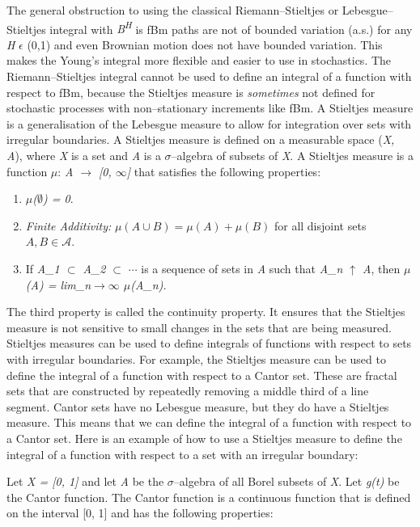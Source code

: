 \documentclass[12pt,a4paper]{report}
\numberwithin{equation}{section}
\begin{document}
The general obstruction to using the classical
Riemann--Stieltjes or Lebesgue--Stieltjes integral with
\emph{B\textsuperscript{H}} is fBm paths are not of bounded variation
(a.s.) for any \emph{H} \(\epsilon\) (0,1) and even Brownian motion does
not have bounded variation. This makes the Young's integral more
flexible and easier to use in stochastics. The Riemann--Stieltjes
integral cannot be used to define an integral of a function with respect
to fBm, because the Stieltjes measure is \emph{sometimes} not defined
for stochastic processes with non--stationary increments like fBm. A
Stieltjes measure is a generalisation of the Lebesgue measure to allow
for integration over sets with irregular boundaries. A Stieltjes measure
is defined on a measurable space (\emph{X, A}), where \emph{X} is a set
and \emph{A} is a $\sigma$--algebra of subsets of \emph{X}. A Stieltjes measure
is a function \emph{$\mu$}: \emph{A $\rightarrow$ {[}0, $\infty${]}} that satisfies the
following properties:

\begin{enumerate}
\def\labelenumi{\roman{enumi}.}
\item
  \emph{$\mu$($\emptyset$) = 0}.
\item \emph{Finite Additivity:} $\mu(A \cup B) = \mu(A) + \mu(B)$ for all disjoint sets $A, B \in \mathcal{A}$.
\item
  If \emph{A\_1 $\subset$ A\_2 $\subset$} $\cdots$ is a sequence of sets in \emph{A} such that
  \emph{A\_n $\uparrow$ A}, then \emph{$\mu$(A) = lim\_n$\rightarrow$$\infty$ $\mu$(A\_n).}
\end{enumerate}

The third property is called the continuity property. It ensures that
the Stieltjes measure is not sensitive to small changes in the sets that
are being measured. Stieltjes measures can be used to define integrals
of functions with respect to sets with irregular boundaries. For
example, the Stieltjes measure can be used to define the integral of a
function with respect to a Cantor set. These are fractal sets that are
constructed by repeatedly removing a middle third of a line segment.
Cantor sets have no Lebesgue measure, but they do have a Stieltjes
measure. This means that we can define the integral of a function with
respect to a Cantor set. Here is an example of how to use a Stieltjes
measure to define the integral of a function with respect to a set with
an irregular boundary:

Let \emph{X = {[}0, 1{]}} and let \emph{A} be the $\sigma$--algebra of all Borel
subsets of \emph{X}. Let \emph{g(t)} be the Cantor function. The Cantor
function is a continuous function that is defined on the interval {[}0,
1{]} and has the following properties:
\end{document}
